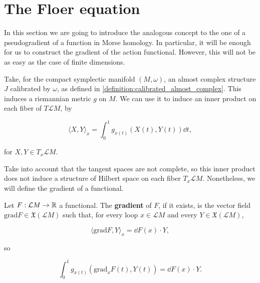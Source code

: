 \section{The Floer equation}

In this section we are going to introduce the analogous concept to the one of a pseudogradient of a function in Morse homology. In particular, it will be enough for us to construct the gradient of the action functional. However, this will not be as easy as the case of finite dimensions.

Take, for the compact symplectic manifold $(M,\omega)$, an almost complex structure $J$ calibrated by $\omega$, as defined in \ref{definition:calibrated_almost_complex}. This induces a riemannian metric $g$ on $M$. We can use it to induce an inner product on each fiber of $T\mathcal{L}M$, by

$$\langle X, Y \rangle_x = \int_0^1 g_{x(t)} (X(t), Y(t)) \dd t,$$

for $X,Y \in T_x\mathcal{L}M$.

Take into account that the tangent spaces are not complete, so this inner product does not induce a structure of Hilbert space on each fiber $T_x\mathcal{L}M$. Nonetheless, we will define the gradient of a functional.

\begin{deff}
Let $F : \mathcal{L}M \rightarrow \mathbb{R}$ a functional. The {\bf gradient} of $F$, if it exists, is the vector field $\text{grad}F \in \mathfrak{X}(\mathcal{L}M)$ such that, for every loop $x \in \mathcal{L}M$ and every $Y \in \mathfrak{X}(\mathcal{L}M)$,

$$\langle \text{grad}F, Y \rangle_x = \dd F(x) \cdot Y ,$$

so

$$\int_0^1 g_{x(t)}(\text{grad}_xF(t),Y(t)) = \dd F(x) \cdot Y .$$
\end{deff}
